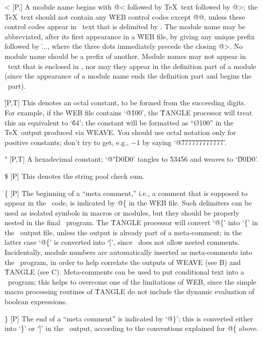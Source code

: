 \@< [P,\oT] A module name begins with \.{@<} followed by \TeX\ text followed
by \.{@>}; the \TeX\ text should not contain any \.{WEB} control codes
except \.{@@}, unless these control codes appear in \PASCAL\ text that
is delimited by \pb. The module name may be abbreviated, after its first
appearance in a \.{WEB} file, by giving any unique prefix followed by \.{...},
where the three dots immediately precede the closing \.{@>}. No module name
should be a prefix of another. Module names may not appear in \PASCAL\
text that is enclosed in \pb, nor may they appear in the definition part
of a module (since the appearance of a module name ends the definition
part and begins the \PASCAL\ part).

\@\' [P,T] This denotes an octal constant, to be formed from the
succeeding digits. For example, if the \.{WEB} file contains `\.{@\'100}',
the \.{TANGLE} processor will treat this an equivalent to `\.{64}';
the constant will be formatted as ``\O{100}'' in the \TeX\ output
produced via \.{WEAVE}. You should use octal notation only for positive
constants; don't try to get, e.g., $-1$ by saying `\.{@\'777777777777}'.

\@" [P,T] A hexadecimal constant; `\.{@"D0D0}' tangles to \.{53456} and
weaves to `\H{D0D0}'.

\@\$ [P] This denotes the string pool check sum.

\@\{ [P] The beginning of a ``meta comment,'' i.e., a comment
that is supposed to appear in the \PASCAL\ code, is indicated by
\.{@\{} in the \.{WEB} file. Such delimiters can be used as
isolated symbols in macros or modules, but they should be properly nested
in the final \PASCAL\ program. The \.{TANGLE} processor will convert
`\.{@\{}' into `\.\{' in the \PASCAL\ output file, unless
the output is already part of a meta-comment; in the latter case
`\.{@\{}' is converted into `\.[', since \PASCAL\ does not allow
nested comments. Incidentally, module numbers are automatically inserted
as meta-comments into the \PASCAL\ program, in order to help correlate the
outputs of \.{WEAVE} (see \Appendix B\null) and \.{TANGLE} (see \Appendix C\null). Meta-comments
can be used to put conditional text into a \PASCAL\ program; this helps to
overcome one of the limitations of \.{WEB}, since the simple macro
processing routines of \.{TANGLE} do not include the dynamic evaluation of
boolean expressions.

\@\} [P] The end of a ``meta comment'' is indicated by `\.{@\}}'; this is
converted either into `\.\}' or `\.{]}' in the \PASCAL\ output, according
to the conventions explained for \.{@\{} above.

